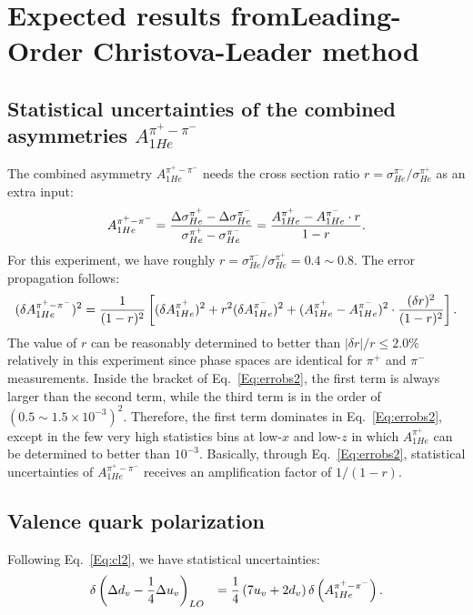 \section{Expected results fromLeading-Order Christova-Leader method}
\subsection{Statistical uncertainties of the combined asymmetries  $A_{1He}^{\pi^+ - \pi^-}$ }
The combined asymmetry $A_{1He}^{\pi^+ - \pi^-}$ needs the 
 cross section ratio $r=\sigma_{He}^{\pi^-}/\sigma_{He}^{\pi^+}$ as an extra input:
\begin{equation}
\label{Eq:obs2}
A_{1He}^{\pi^+ - \pi^-}  =  { \Delta \sigma_{He}^{\pi^+} -\Delta \sigma_{He}^{\pi^-} \over
\sigma_{He}^{\pi^+} - \sigma_{He}^{\pi^-} }=
{ A_{1He}^{\pi^+} -  A_{1He}^{\pi^-} \cdot r
\over 1 - r }.
\end{equation}
For this experiment, we have roughly $r=\sigma^{\pi^-}_{He}/\sigma^{\pi^+}_{He}=0.4 \sim 0.8$. 
The error propagation follows:
\begin{equation}
\label{Eq:errobs2}
(\delta A_{1He}^{\pi^+ - \pi^-})^2  = {1 \over (1 - r)^2} \left[ (\delta  A_{1He}^{\pi^+} )^2 + 
r^2 (\delta  A_{1He}^{\pi^-} )^2
+(A_{1He}^{\pi^+} - A_{1He}^{\pi^-} )^2   \cdot {(\delta r)^2  \over (1 - r)^2}  \right].
\end{equation}
The value of $r$ can be reasonably determined to better than 
 $|\delta r|/r \le 2.0 \%$  relatively in this experiment since phase spaces are identical for $\pi^+$ and 
$\pi^-$ measurements.  
 Inside the bracket of Eq.~\ref{Eq:errobs2}, the first term is always larger than the second term, while the third term is in the order of $(0.5\sim 1.5 \times10^{-3})^2$. 
Therefore, the first term dominates in Eq.~\ref{Eq:errobs2}, except in the few very high statistics bins at low-$x$ and low-$z$ in which  $A_{1He}^{\pi^+}$ can be  determined to better than $10^{-3}$. Basically, through Eq.~\ref{Eq:errobs2}, statistical uncertainties of $A_{1He}^{\pi^+ - \pi^-}$ receives an amplification factor  of $1/(1-r)$.

\subsection{Valence quark polarization}
Following Eq.~\ref{Eq:cl2},  we have  statistical uncertainties:
\begin{eqnarray}
\label{Eq:errcl2}
& \delta \left( \Delta d_v-{1 \over 4} \Delta u_v  \right)_{LO} &  = {1 \over 4} \left( 7 u_v + 2 d_v \right)  \delta \left(A_{1He}^{\pi^+ - \pi^-} \right).
\end{eqnarray}

